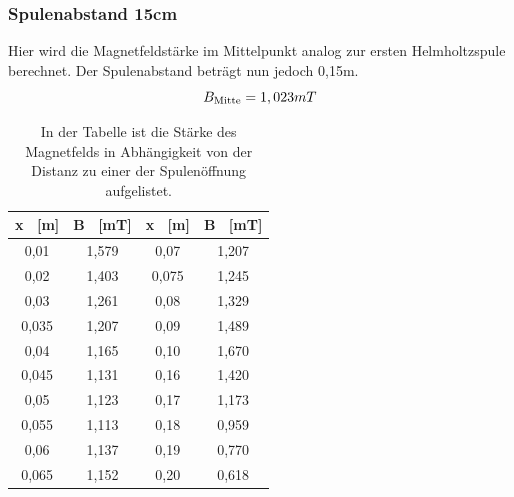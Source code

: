 \documentclass[titlepage = firstcover]{scrartcl}
\begin{document}
            \subsubsection{Spulenabstand 15cm}
            Hier wird die Magnetfeldstärke im Mittelpunkt analog zur ersten Helmholtzspule berechnet. Der Spulenabstand beträgt nun jedoch 0,15m.
            \begin{equation}
                B_{\text{Mitte}} = 1,023mT \\
                \label{eqn:HelmB}
            \end{equation}
            \begin{table}[h]
                \centering 
                \caption{In der Tabelle ist die Stärke des Magnetfelds in Abhängigkeit von der Distanz zu einer der Spulenöffnung aufgelistet.}
                \label{tab:HelmholtzB}

                \begin{tabular}{c c c c}
                    \toprule
                    {x \ [m]} & {B \ [mT]} & {x \ [m]} & {B \ [mT]} \\
                    \midrule
                    0,01  & 1,579 & 0,07 & 1,207 \\
                    0,02  & 1,403 & 0,075 & 1,245 \\
                    0,03  & 1,261 & 0,08 & 1,329 \\
                    0,035 & 1,207 & 0,09 & 1,489 \\
                    0,04  & 1,165 & 0,10 & 1,670 \\
                    0,045 & 1,131 & 0,16 & 1,420 \\
                    0,05  & 1,123 & 0,17 & 1,173 \\
                    0,055 & 1,113 & 0,18 & 0,959 \\
                    0,06  & 1,137 & 0,19 & 0,770 \\
                    0,065 & 1,152 & 0,20 & 0,618 \\
                    \bottomrule
                \end{tabular}                
            \end{table}
\end{document}
